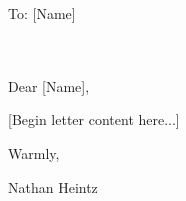 \documentclass[a4paper, 11pt]{article}
\begin{document}


\noindent [Date]
\noindent

To: [Name]\\
[Organization]\\
[Address Line 1]\\
[Address Line 2]

\vspace{1.5em}

Dear [Name],

\vspace{1em}

[Begin letter content here...]

\vspace{1em}

Warmly,

\vspace{1em}

\noindent Nathan Heintz
\end{document}
